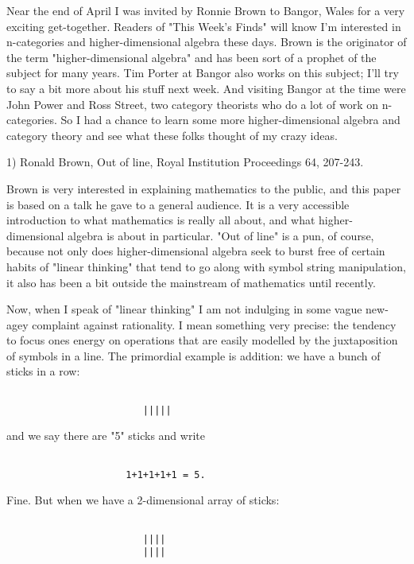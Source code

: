 

Near the end of April I was invited by Ronnie Brown to 
Bangor, Wales for a very exciting get-together.  Readers of
"This Week's Finds" will know I'm interested in n-categories
and higher-dimensional algebra these days.  Brown is
the originator of the term "higher-dimensional algebra"
and has been sort of a prophet of the subject for many years.
Tim Porter at Bangor also works on this subject; 
I'll try to say a bit more about his stuff next week.  And visiting
Bangor at the time were John Power and Ross Street, two category 
theorists who do a lot of work on n-categories.   So I had a chance 
to learn some more higher-dimensional algebra and category theory
and see what these folks thought of my crazy ideas.

1) Ronald Brown, Out of line, Royal Institution Proceedings
64, 207-243.


Brown is very interested in explaining mathematics to the
public, and this paper is based on a talk he gave to a 
general audience.  It is a very accessible introduction to what
mathematics is really all about, and what higher-dimensional
algebra is about in particular.   "Out of line" is a pun, of
course, because not only does higher-dimensional algebra seek
to burst free of certain habits of "linear thinking" that tend
to go along with symbol string manipulation, it also has been
a bit outside the mainstream of mathematics until recently.  

Now, when I speak of "linear thinking" I am not indulging in
some vague new-agey complaint against rationality.  I mean
something very precise: the tendency to focus ones energy
on operations that are easily modelled by the juxtaposition
of symbols in a line.  The primordial example is addition:
we have a bunch of sticks in a row:


\begin{verbatim}

                        |||||
\end{verbatim}
    

and we say there are "5" sticks and write


\begin{verbatim}

                     1+1+1+1+1 = 5.
\end{verbatim}
    

Fine.  But when we have a 2-dimensional array of sticks:


\begin{verbatim}

                        ||||
                        ||||
\end{verbatim}
    
